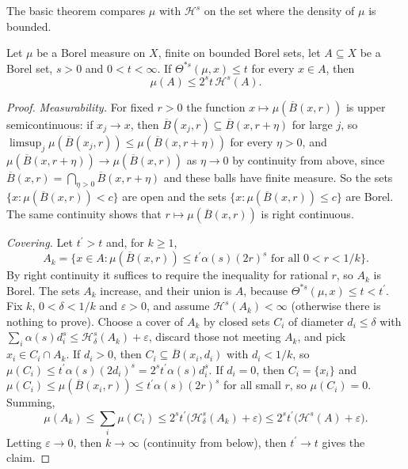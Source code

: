 The basic theorem compares $\mu$ with $\mathcal{H}^s$ on the set where the density of $\mu$ is bounded.

\begin{theorem}\label{geometric-measure-theory:theorem-density-comparison}
Let $\mu$ be a Borel measure on $X$, finite on bounded Borel sets, let $A \subseteq X$ be a Borel set, $s > 0$ and $0 < t < \infty$. If $\Theta^{*s}(\mu, x) \leq t$ for every $x \in A$, then
\[
\mu(A) \leq 2^st\,\mathcal{H}^s(A).
\]
\end{theorem}

\begin{proof}
\emph{Measurability.} For fixed $r > 0$ the function $x \mapsto \mu(\overline{B}(x, r))$ is upper semicontinuous: if $x_j \to x$, then $\overline{B}(x_j, r) \subseteq \overline{B}(x, r + \eta)$ for large $j$,
so $\limsup_j\mu(\overline{B}(x_j, r)) \leq \mu(\overline{B}(x, r + \eta))$ for every $\eta > 0$, and $\mu(\overline{B}(x, r + \eta)) \to \mu(\overline{B}(x, r))$ as $\eta \to 0$ by continuity from above, since
$\overline{B}(x, r) = \bigcap_{\eta > 0}\overline{B}(x, r + \eta)$ and these balls have finite measure. So the sets $\{x : \mu(\overline{B}(x, r)) < c\}$ are open and the sets
$\{x : \mu(\overline{B}(x, r)) \leq c\}$ are Borel. The same continuity shows that $r \mapsto \mu(\overline{B}(x, r))$ is right continuous.

\emph{Covering.} Let $t^{\prime} > t$ and, for $k \geq 1$,
\[
A_k = \bigl\{x \in A : \mu(\overline{B}(x, r)) \leq t^{\prime}\alpha(s)(2r)^s \text{ for all } 0 < r < 1/k\bigr\}.
\]
By right continuity it suffices to require the inequality for rational $r$, so $A_k$ is Borel. The sets $A_k$ increase, and their union is $A$, because $\Theta^{*s}(\mu, x) \leq t < t^{\prime}$. Fix $k$,
$0 < \delta < 1/k$ and $\varepsilon > 0$, and assume $\mathcal{H}^s(A_k) < \infty$ (otherwise there is nothing to prove). Choose a cover of $A_k$ by closed sets $C_i$ of diameter $d_i \leq \delta$ with
$\sum_i\alpha(s)d_i^s \leq \mathcal{H}^s_\delta(A_k) + \varepsilon$, discard those not meeting $A_k$, and pick $x_i \in C_i \cap A_k$. If $d_i > 0$, then $C_i \subseteq \overline{B}(x_i, d_i)$ with $d_i < 1/k$, so
$\mu(C_i) \leq t^{\prime}\alpha(s)(2d_i)^s = 2^st^{\prime}\alpha(s)d_i^s$. If $d_i = 0$, then $C_i = \{x_i\}$ and $\mu(C_i) \leq \mu(\overline{B}(x_i, r)) \leq t^{\prime}\alpha(s)(2r)^s$ for all small $r$, so
$\mu(C_i) = 0$. Summing,
\[
\mu(A_k) \leq \sum_i\mu(C_i) \leq 2^st^{\prime}\bigl(\mathcal{H}^s_\delta(A_k) + \varepsilon\bigr) \leq 2^st^{\prime}\bigl(\mathcal{H}^s(A) + \varepsilon\bigr).
\]
Letting $\varepsilon \to 0$, then $k \to \infty$ (continuity from below), then $t^{\prime} \to t$ gives the claim.
\end{proof}

